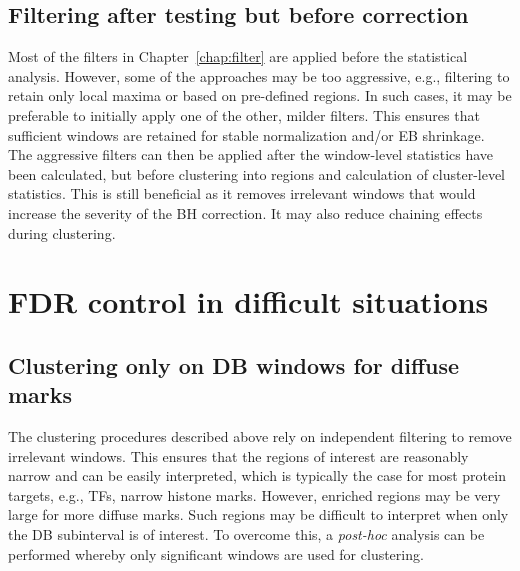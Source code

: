 \documentclass[12pt]{report}
\begin{document}
\subsection{Filtering after testing but before correction}
Most of the filters in Chapter~\ref{chap:filter} are applied before the statistical analysis.
However, some of the approaches may be too aggressive, e.g., filtering to retain only local maxima or based on pre-defined regions.
In such cases, it may be preferable to initially apply one of the other, milder filters.
This ensures that sufficient windows are retained for stable normalization and/or EB shrinkage.
The aggressive filters can then be applied after the window-level statistics have been calculated, but before clustering into regions and calculation of cluster-level statistics.
This is still beneficial as it removes irrelevant windows that would increase the severity of the BH correction.
It may also reduce chaining effects during clustering.

\section{FDR control in difficult situations}

\subsection{Clustering only on DB windows for diffuse marks}
The clustering procedures described above rely on independent filtering to remove irrelevant windows.
This ensures that the regions of interest are reasonably narrow and can be easily interpreted, 
    which is typically the case for most protein targets, e.g., TFs, narrow histone marks.
However, enriched regions may be very large for more diffuse marks.
Such regions may be difficult to interpret when only the DB subinterval is of interest.
To overcome this, a \textit{post-hoc} analysis can be performed whereby only significant windows are used for clustering.
\end{document}
